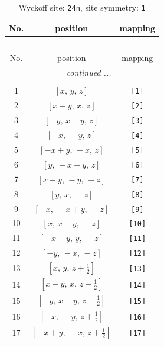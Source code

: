 \documentclass[fleqn,8pt]{jsarticle}
\begin{document}
\begin{longtable}{ccc}
\caption{Wyckoff site: {\tt 24n}, site symmetry: {\tt 1}}
 \\
 \hline \hline
No. & position & mapping \\ \hline \endfirsthead

\multicolumn{2}{l}{\tablename\ \thetable{}} \\
 \hline \hline
No. & position & mapping \\ \hline \endhead

 \hline \hline
\multicolumn{2}{r}{\footnotesize\it continued ...} \\ \endfoot

 \hline \hline
\multicolumn{2}{r}{} \\ \endlastfoot

1 & $\left[ x,\, y,\, z \right]$ & {\tt [1]} \\ \hline
2 & $\left[ x - y,\, x,\, z \right]$ & {\tt [2]} \\ \hline
3 & $\left[ - y,\, x - y,\, z \right]$ & {\tt [3]} \\ \hline
4 & $\left[ - x,\, - y,\, z \right]$ & {\tt [4]} \\ \hline
5 & $\left[ - x + y,\, - x,\, z \right]$ & {\tt [5]} \\ \hline
6 & $\left[ y,\, - x + y,\, z \right]$ & {\tt [6]} \\ \hline
7 & $\left[ x - y,\, - y,\, - z \right]$ & {\tt [7]} \\ \hline
8 & $\left[ y,\, x,\, - z \right]$ & {\tt [8]} \\ \hline
9 & $\left[ - x,\, - x + y,\, - z \right]$ & {\tt [9]} \\ \hline
10 & $\left[ x,\, x - y,\, - z \right]$ & {\tt [10]} \\ \hline
11 & $\left[ - x + y,\, y,\, - z \right]$ & {\tt [11]} \\ \hline
12 & $\left[ - y,\, - x,\, - z \right]$ & {\tt [12]} \\ \hline
13 & $\left[ x,\, y,\, z + \frac{1}{2} \right]$ & {\tt [13]} \\ \hline
14 & $\left[ x - y,\, x,\, z + \frac{1}{2} \right]$ & {\tt [14]} \\ \hline
15 & $\left[ - y,\, x - y,\, z + \frac{1}{2} \right]$ & {\tt [15]} \\ \hline
16 & $\left[ - x,\, - y,\, z + \frac{1}{2} \right]$ & {\tt [16]} \\ \hline
17 & $\left[ - x + y,\, - x,\, z + \frac{1}{2} \right]$ & {\tt [17]} \\ \hline

\end{longtable}
\end{document}
